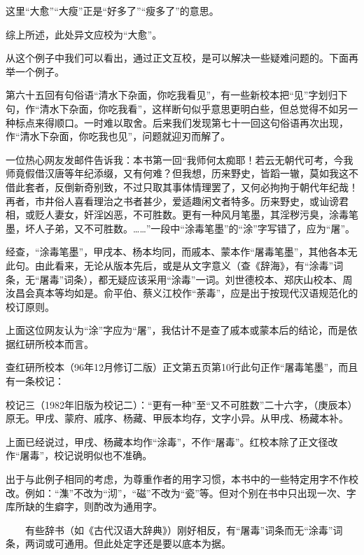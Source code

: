 这里“大愈”“大瘦”正是“好多了”“瘦多了”的意思。

综上所述，此处异文应校为“大愈”。

从这个例子中我们可以看出，通过正文互校，是可以解决一些疑难问题的。下面再举一个例子。

第六十五回有句俗语“清水下杂面，你吃我看见”，有一些新校本把“见”字划归下句，作“清水下杂面，你吃我看”，这样断句似乎意思更明白些，但总觉得不如另一种标点来得顺口。一时难以取舍。后来我们发现第七十一回这句俗语再次出现，作“清水下杂面，你吃我也见”，问题就迎刃而解了。

{{}}

一位热心网友发邮件告诉我：本书第一回“我师何太痴耶！若云无朝代可考，今我师竟假借汉唐等年纪添缀，又有何难？但我想，历来野史，皆蹈一辙，莫如我这不借此套者，反倒新奇别致，不过只取其事体情理罢了，又何必拘拘于朝代年纪哉！再者，市井俗人喜看理治之书者甚少，爱适趣闲文者特多。历来野史，或讪谤君相，或贬人妻女，奸淫凶恶，不可胜数。更有一种风月笔墨，其淫秽污臭，涂毒笔墨，坏人子弟，又不可胜数。\ldots{}\ldots{}”一段中“涂毒笔墨”的“涂”字写错了，应为“屠”。

经查，“涂毒笔墨”，甲戌本、杨本均同，而戚本、蒙本作“屠毒笔墨”，其他各本无此句。由此看来，无论从版本先后，或是从文字意义（查《辞海》，有“涂毒”词条，无“屠毒”词条\hyperref[label-2]{\textsuperscript{}}），都无疑应该采用“涂毒”一词。刘世德校本、郑庆山校本、周汝昌会真本等均如是。俞平伯、蔡义江校作“荼毒”，应是出于按现代汉语规范化的校订原则。

上面这位网友认为“涂”字应为“屠”，我估计不是查了戚本或蒙本后的结论，而是依据红研所校本而言。

查红研所校本（96年12月修订二版）正文第五页第10行此句正作“屠毒笔墨”，而且有一条校记：

校记三（1982年旧版为校记二）：“更有一种”至“又不可胜数”二十六字，（庚辰本）原无。甲戌、蒙府、戚序、杨藏、甲辰本均存，文字小异。从甲戌、杨藏本补。

上面已经说过，甲戌、杨藏本均作“涂毒”，不作“屠毒”。红校本除了正文径改作“屠毒”，校记说明似也不准确。

出于与此例子相同的考虑，为尊重作者的用字习惯，本书中的一些特定用字不作校改。例如：“潗”不改为“沏”，“磁”不改为“瓷”等。但对个别在书中只出现一次、字库所缺的生癖字，则酌改为通用字。

{　　\href{../Text/part0088.html\#navto_1_a}{}有些辞书（如《古代汉语大辞典》）刚好相反，有“屠毒”词条而无“涂毒”词条，两词或可通用。但此处定字还是要以底本为据。}

